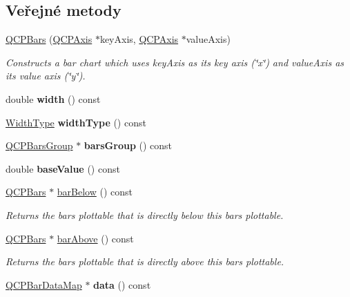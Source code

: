 \subsection*{Veřejné metody}
\begin{DoxyCompactItemize}
\item 
\hyperlink{classQCPBars_a64006999ad9dff308f40df41cef176ad}{Q\+C\+P\+Bars} (\hyperlink{classQCPAxis}{Q\+C\+P\+Axis} $\ast$key\+Axis, \hyperlink{classQCPAxis}{Q\+C\+P\+Axis} $\ast$value\+Axis)
\begin{DoxyCompactList}\small\item\em Constructs a bar chart which uses {\itshape key\+Axis} as its key axis (\char`\"{}x\char`\"{}) and {\itshape value\+Axis} as its value axis (\char`\"{}y\char`\"{}). \end{DoxyCompactList}\item 
\hypertarget{classQCPBars_a42798c38abd5f5db22bd45d77f429625}{}double {\bfseries width} () const \label{classQCPBars_a42798c38abd5f5db22bd45d77f429625}

\item 
\hypertarget{classQCPBars_a8606651ada5804075f6affd04c88dd05}{}\hyperlink{classQCPBars_a65dbbf1ab41cbe993d71521096ed4649}{Width\+Type} {\bfseries width\+Type} () const \label{classQCPBars_a8606651ada5804075f6affd04c88dd05}

\item 
\hypertarget{classQCPBars_a6d6b2b17619a0ba9c7a88bb2b90fc178}{}\hyperlink{classQCPBarsGroup}{Q\+C\+P\+Bars\+Group} $\ast$ {\bfseries bars\+Group} () const \label{classQCPBars_a6d6b2b17619a0ba9c7a88bb2b90fc178}

\item 
\hypertarget{classQCPBars_a3c8686a74396883fd1da87b2e325b043}{}double {\bfseries base\+Value} () const \label{classQCPBars_a3c8686a74396883fd1da87b2e325b043}

\item 
\hyperlink{classQCPBars}{Q\+C\+P\+Bars} $\ast$ \hyperlink{classQCPBars_a2c46a686cbad95f180ca3c2e88263961}{bar\+Below} () const 
\begin{DoxyCompactList}\small\item\em Returns the bars plottable that is directly below this bars plottable. \end{DoxyCompactList}\item 
\hyperlink{classQCPBars}{Q\+C\+P\+Bars} $\ast$ \hyperlink{classQCPBars_a9ca48a6577586825d85bdc1fbf410803}{bar\+Above} () const 
\begin{DoxyCompactList}\small\item\em Returns the bars plottable that is directly above this bars plottable. \end{DoxyCompactList}\item 
\hypertarget{classQCPBars_ac05c21de37f677545d06fd852ef8a743}{}\hyperlink{qcustomplot_8h_aa846c77472cae93def9f1609d0c57191}{Q\+C\+P\+Bar\+Data\+Map} $\ast$ {\bfseries data} () const \label{classQCPBars_ac05c21de37f677545d06fd852ef8a743}


\end{DoxyCompactItemize}
